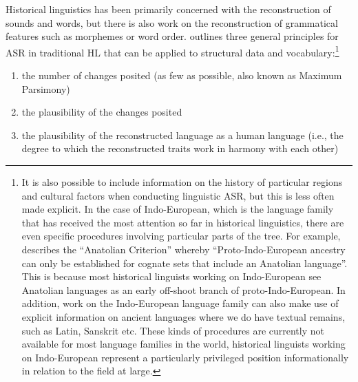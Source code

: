 \documentclass[12pt,letterpaper]{article}
\begin{document}
Historical linguistics has been primarily concerned with the reconstruction of sounds and words, but there is also work on the reconstruction of grammatical features such as morphemes or word order. \citet[17--22]{clark1973aspects} outlines three general principles for ASR in traditional HL that can be applied to structural data and vocabulary:\footnote{It is also possible to include information on the history of particular regions and cultural factors when conducting linguistic ASR, but this is less often made explicit. In the case of Indo-European, which is the language family that has received the most attention so far in historical linguistics, there are even specific procedures involving particular parts of the tree. For example, \citet[6]{goldstein_2022} describes the ``Anatolian Criterion'' whereby ``Proto-Indo-European ancestry can only be established for cognate sets that include an Anatolian language''. This is because most historical linguists working on Indo-European see Anatolian languages as an early off-shoot branch of proto-Indo-European. In addition, work on the Indo-European language family can also make use of explicit information on ancient languages where we do have textual remains, such as Latin, Sanskrit etc. These kinds of procedures are currently not available for most language families in the world, historical linguists working on Indo-European represent a particularly privileged position informationally in relation to the field at large.}

\begin{enumerate}[label=(\roman*)]
\item the number of changes posited (as few as possible, also known as Maximum Parsimony)
\item the plausibility of the changes posited
\item the plausibility of the reconstructed language as a human language (i.e., the degree to which the reconstructed traits work in harmony with each other)
\end{enumerate}

\end{document}
